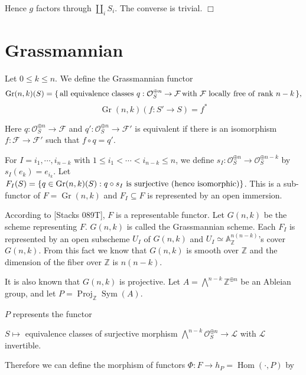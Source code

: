 \documentclass{article}
\theoremstyle{theorem}
\begin{document}
    Hence $g$ factors through $\coprod_i S_i$. The converse is trivial. $\Box$
    
    \section{Grassmannian}
    Let $0 \leq k \leq n.$ We define the Grassmannian functor
    $$\operatorname{Gr}(n,k)(S) = \{\,  {\rm all \ equivalence \ classes} \ q : \mathcal O_S^{\oplus n} \rightarrow \mathcal F \, {\rm with \ } \mathcal F {\rm \ locally \ free \ of \ rank \ } n - k \,\},$$
    $$\operatorname{Gr}(n,k)(f : S' \rightarrow S) = f^*$$
    
    Here $q : \mathcal O_S^{\oplus n} \rightarrow \mathcal F$ and $q' : \mathcal O_S^{\oplus n} \rightarrow \mathcal F'$ is equivalent if there is an isomorphism $f : \mathcal F \rightarrow \mathcal F'$ such that $f \circ q = q'.$
    \newline
    
    For $I = {i_1, \cdots, i_{n-k}}$ with $1 \leq i_1 < \cdots < i_{n-k} \leq n$, we define $s_I : \mathcal O_S^{\oplus n} \rightarrow \mathcal O_S^{\oplus n-k}$ by $s_I(e_k) = e_{i_k}$. Let $F_I(S) = \{ q \in \operatorname{Gr}(n,k)(S) : q \circ s_I {\rm \ is \ surjective \ (hence \ isomorphic) } \}$. This is a sub-functor of $F = \operatorname{Gr}(n,k)$ and $F_I \subseteq F$ is represented by an open immersion.
    
    According to {[Stacks 089T]}, $F$ is a representable functor. Let $G(n,k)$ be the scheme representing $F$. $G(n,k)$ is called the Grassmannian scheme. Each $F_I$ is represented by an open subscheme $U_I$ of $G(n,k)$ and $U_I \simeq \mathbb A^{n(n-k)}_{\mathbb Z}$'s cover $G(n,k)$. From this fact we know that $G(n,k)$ is smooth over $\mathbb Z$ and the dimension of the fiber over $\mathbb Z$ is $n(n-k).$
    
    It is also known that $G(n,k)$ is projective. Let $\displaystyle A = \bigwedge^{n-k} \mathbb Z^{\oplus n}$ be an Ableian group, and let $P = \operatorname{Proj}_{\mathbb Z} \operatorname{Sym}(A).$
    
    $P$ represents the functor
    
    $S \mapsto $ equivalence classes of surjective morphism $\displaystyle \bigwedge^{n-k} \mathcal O_S^{\oplus n} \rightarrow \mathcal L$ with $\mathcal L$ invertible.
    
    Therefore we can define the morphism of functors $\Phi : F \rightarrow h_P = \operatorname{Hom}(\cdot, P)$ by
    
\end{document}
